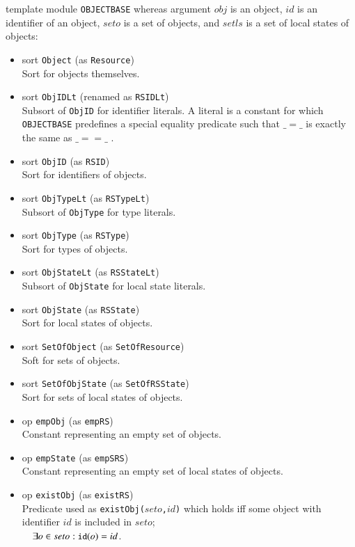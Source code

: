 \documentclass[12pt]{report}
\newcommand{\mbstt}[1]{\mbox{\small{\tt {#1}}}}
\newcommand{\stt}[1]{{\small{\tt {#1}}}}
\begin{document}
template module {\tt OBJECTBASE} whereas argument $obj$ is an object,
$id$ is an identifier of an object, $seto$ is a set of objects, and
$setls$ is a set of local states of objects:
\begin{itemize}
\item sort \stt{Object} (as \stt{Resource})\\
  Sort for objects themselves.
\item sort \stt{ObjIDLt} (renamed as \stt{RSIDLt})\\
  Subsort of {\tt ObjID} for identifier literals. A literal is a
  constant for which {\tt OBJECTBASE} predefines a special equality
  predicate such that $\_ = \_$ is exactly the same as $\_ == \_ $ .
\item sort \stt{ObjID} (as \stt{RSID})\\
  Sort for identifiers of objects.
\item sort \stt{ObjTypeLt} (as \stt{RSTypeLt})\\
  Subsort of {\tt ObjType} for type literals.
\item sort \stt{ObjType} (as \stt{RSType})\\
  Sort for types of objects.
\item sort \stt{ObjStateLt} (as \stt{RSStateLt})\\
  Subsort of {\tt ObjState} for local state literals.
\item sort \stt{ObjState} (as \stt{RSState})\\
  Sort for local states of objects.
\item sort \stt{SetOfObject} (as \stt{SetOfResource})\\
  Soft for sets of objects.
\item sort \stt{SetOfObjState} (as \stt{SetOfRSState})\\
  Sort for sets of local states of objects.
\item op \stt{empObj} (as \stt{empRS})\\
  Constant representing an empty set of objects.
\item op \stt{empState} (as \stt{empSRS})\\
  Constant representing an empty set of local states of objects.
\item op \stt{existObj} (as \stt{existRS})\\ 
  Predicate used as \stt{existObj($seto$,$id$)} which holds iff some
  object with identifier $id$ is included in $seto$;\\$~~~~\exists o\in
  seto: \mbstt{id}(o)=id$.

\end{itemize}
\end{document}
